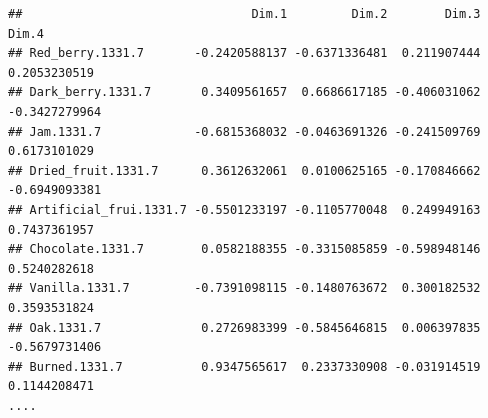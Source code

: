 \documentclass[
]{book}
\begin{document}
\begin{verbatim}
##                                Dim.1         Dim.2        Dim.3         Dim.4
## Red_berry.1331.7       -0.2420588137 -0.6371336481  0.211907444  0.2053230519
## Dark_berry.1331.7       0.3409561657  0.6686617185 -0.406031062 -0.3427279964
## Jam.1331.7             -0.6815368032 -0.0463691326 -0.241509769  0.6173101029
## Dried_fruit.1331.7      0.3612632061  0.0100625165 -0.170846662 -0.6949093381
## Artificial_frui.1331.7 -0.5501233197 -0.1105770048  0.249949163  0.7437361957
## Chocolate.1331.7        0.0582188355 -0.3315085859 -0.598948146  0.5240282618
## Vanilla.1331.7         -0.7391098115 -0.1480763672  0.300182532  0.3593531824
## Oak.1331.7              0.2726983399 -0.5845646815  0.006397835 -0.5679731406
## Burned.1331.7           0.9347565617  0.2337330908 -0.031914519  0.1144208471
....
\end{verbatim}
\end{document}

